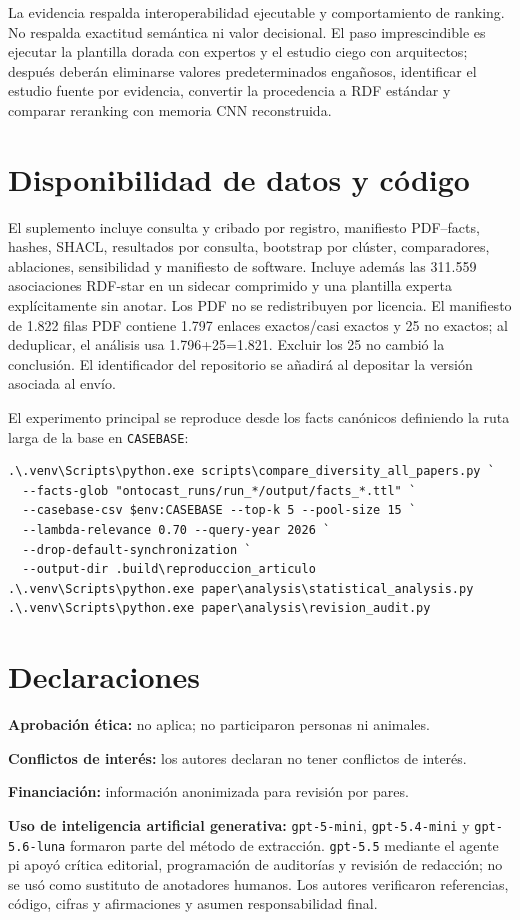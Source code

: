 \documentclass[11pt,a4paper]{article}
\begin{document}
La evidencia respalda interoperabilidad ejecutable y comportamiento de ranking. No respalda exactitud semántica ni valor decisional. El paso imprescindible es ejecutar la plantilla dorada con expertos y el estudio ciego con arquitectos; después deberán eliminarse valores predeterminados engañosos, identificar el estudio fuente por evidencia, convertir la procedencia a RDF estándar y comparar reranking con memoria CNN reconstruida.

\section*{Disponibilidad de datos y código}
El suplemento incluye consulta y cribado por registro, manifiesto PDF--facts, hashes, SHACL, resultados por consulta, bootstrap por clúster, comparadores, ablaciones, sensibilidad y manifiesto de software. Incluye además las 311.559 asociaciones RDF-star en un sidecar comprimido y una plantilla experta explícitamente sin anotar. Los PDF no se redistribuyen por licencia. El manifiesto de 1.822 filas PDF contiene 1.797 enlaces exactos/casi exactos y 25 no exactos; al deduplicar, el análisis usa 1.796+25=1.821. Excluir los 25 no cambió la conclusión. El identificador del repositorio se añadirá al depositar la versión asociada al envío.

El experimento principal se reproduce desde los facts canónicos definiendo la ruta larga de la base en \texttt{CASEBASE}:

\begin{verbatim}
.\.venv\Scripts\python.exe scripts\compare_diversity_all_papers.py `
  --facts-glob "ontocast_runs/run_*/output/facts_*.ttl" `
  --casebase-csv $env:CASEBASE --top-k 5 --pool-size 15 `
  --lambda-relevance 0.70 --query-year 2026 `
  --drop-default-synchronization `
  --output-dir .build\reproduccion_articulo
.\.venv\Scripts\python.exe paper\analysis\statistical_analysis.py
.\.venv\Scripts\python.exe paper\analysis\revision_audit.py
\end{verbatim}

\section*{Declaraciones}
\textbf{Aprobación ética:} no aplica; no participaron personas ni animales.\par
\textbf{Conflictos de interés:} los autores declaran no tener conflictos de interés.\par
\textbf{Financiación:} información anonimizada para revisión por pares.\par
\textbf{Uso de inteligencia artificial generativa:} \texttt{gpt-5-mini}, \texttt{gpt-5.4-mini} y \texttt{gpt-5.6-luna} formaron parte del método de extracción. \texttt{gpt-5.5} mediante el agente pi apoyó crítica editorial, programación de auditorías y revisión de redacción; no se usó como sustituto de anotadores humanos. Los autores verificaron referencias, código, cifras y afirmaciones y asumen responsabilidad final.
\end{document}
